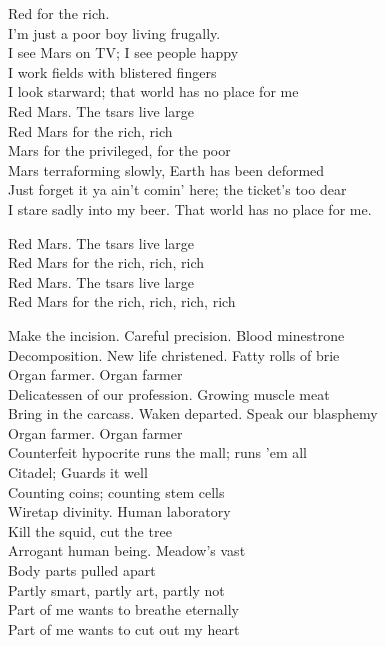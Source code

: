 Red  for the rich.\\

I'm just a poor boy living frugally.\\
I see Mars on TV; I see people happy \\
I work fields with blistered fingers \\
I look starward; that world has no place for me \\

Red Mars. The tsars live large \\
Red Mars for the rich, rich \\

Mars for the privileged,  for the poor \\
Mars terraforming slowly, Earth has been deformed \\
Just forget it ya ain't comin' here; the ticket's too dear \\
I stare sadly into my beer. That world has no place for me.

Red Mars. The tsars live large \\
Red Mars for the rich, rich, rich \\
Red Mars. The tsars live large \\
Red Mars for the rich, rich, rich, rich \\




Make the incision. Careful precision. Blood minestrone \\
Decomposition. New life christened. Fatty rolls of brie \\

Organ farmer. Organ farmer \\

Delicatessen of our profession. Growing muscle meat \\
Bring in the carcass. Waken departed. Speak our blasphemy \\

Organ farmer. Organ farmer \\

Counterfeit hypocrite runs the mall; runs 'em all \\
Citadel; Guards it well \\
Counting coins; counting stem cells \\
Wiretap divinity. Human laboratory \\
Kill the squid, cut the tree \\
Arrogant human being. Meadow's vast \\
Body parts pulled apart \\
Partly smart, partly art, partly not \\
Part of me wants to breathe eternally \\
Part of me wants to cut out my heart \\

